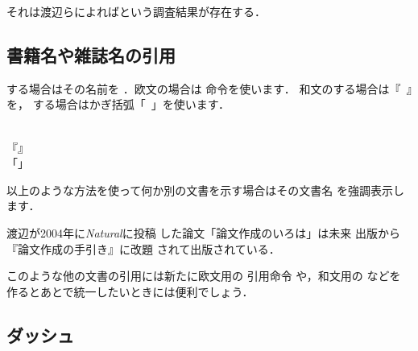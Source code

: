 {\begin{InOut}
それは渡辺らによればという調査結果が存在する．
\end{InOut}

\subsection{書籍名や雑誌名の引用}

%
%
%
%
%
%
する場合はその名前を
．欧文の場合は  命令を使います．
和文のする場合は『~』を，
する場合はかぎ括弧「~」を使います．
\begin{Syntax}
%
%
       \\
『』\\
「」
\end{Syntax}
以上のような方法を使って何か別の文書を示す場合はその文書名
を強調表示します．
\begin{InOut}
渡辺が2004年に\emph{Natural}に投稿
した論文「論文作成のいろは」は未来
出版から『論文作成の手引き』に改題
されて出版されている．
\end{InOut}

\begin{Trick}
このような他の文書の引用には新たに欧文用の
引用命令  や，和文用の  などを
作るとあとで統一したいときには便利でしょう．

\begin{InTeX}
\newcommand{\yousyo}[1]{\emph{#1}}%
\newcommand{\wasyo}[1]{『#1』}%
\end{InTeX}

\end{Trick}


\subsection{ダッシュ}

}
